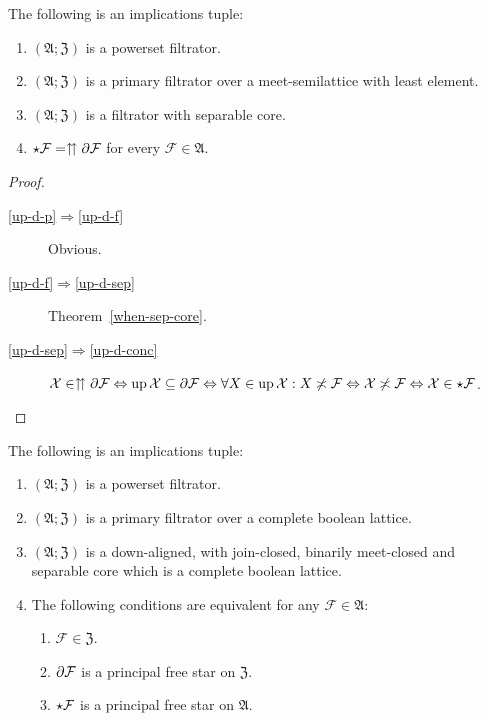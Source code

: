 \begin{prop}
The following is an implications tuple:
\begin{enumerate}
\item \label{up-d-p}$(\mathfrak{A};\mathfrak{Z})$ is a powerset filtrator.
\item \label{up-d-f}$(\mathfrak{A};\mathfrak{Z})$ is a primary filtrator
over a meet-semilattice with least element.
\item \label{up-d-sep}$(\mathfrak{A};\mathfrak{Z})$ is a filtrator with
separable core.
\item \label{up-d-conc}$\star\mathcal{F}=\upuparrows\partial\mathcal{F}$
for every $\mathcal{F}\in\mathfrak{A}$.
\end{enumerate}
\end{prop}
\begin{proof}
~
\begin{description}
\item [{\ref{up-d-p}$\Rightarrow$\ref{up-d-f}}] Obvious.
\item [{\ref{up-d-f}$\Rightarrow$\ref{up-d-sep}}] Theorem~\ref{when-sep-core}.
\item [{\ref{up-d-sep}$\Rightarrow$\ref{up-d-conc}}] $\mathcal{X}\in\upuparrows\partial\mathcal{F}\Leftrightarrow\operatorname{up}\mathcal{X}\subseteq\partial\mathcal{F}\Leftrightarrow\forall X\in\operatorname{up}\mathcal{X}:X\not\asymp\mathcal{F}\Leftrightarrow\mathcal{X}\not\asymp\mathcal{F}\Leftrightarrow\mathcal{X}\in\star\mathcal{F}$.
\end{description}
\end{proof}
\begin{prop}
\label{compl-eq-princ}The following is an implications tuple:
\begin{enumerate}
\item \label{crit1-p-1}$(\mathfrak{A};\mathfrak{Z})$ is a powerset filtrator.
\item \label{crit1-f-1}$(\mathfrak{A};\mathfrak{Z})$ is a primary filtrator
over a complete boolean lattice.
\item \label{crit1-fltr-1}$(\mathfrak{A};\mathfrak{Z})$ is a down-aligned,
with join-closed, binarily meet-closed and separable core which is
a complete boolean lattice.
\item \label{crit1-conc-1}The following conditions are equivalent for any
$\mathcal{F}\in\mathfrak{A}$:

\begin{enumerate}
\item \label{princ-star-princ}$\mathcal{F}\in\mathfrak{Z}$.
\item \label{princ-star-core}$\partial\mathcal{F}$ is a principal free
star on $\mathfrak{Z}$.
\item \label{princ-star-full}$\star\mathcal{F}$ is a principal free
star on $\mathfrak{A}$.
\end{enumerate}
\end{enumerate}
\end{prop}
